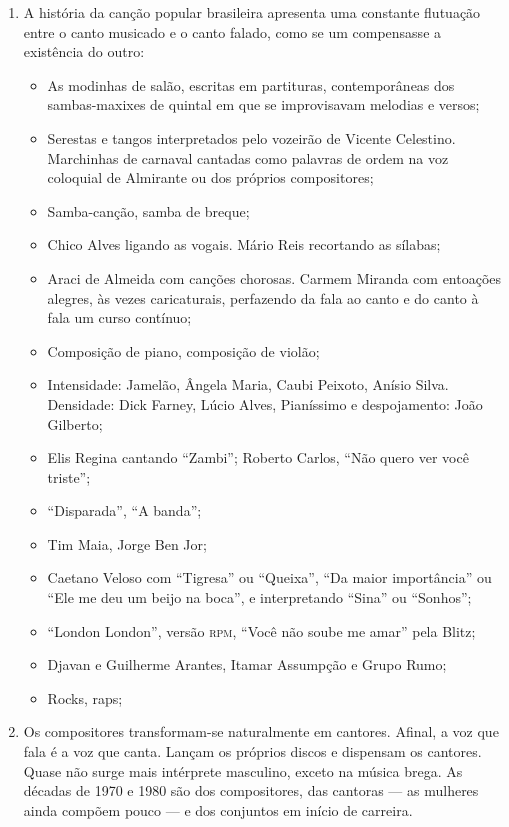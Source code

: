 \begin{enumerate}
\item A história da canção popular brasileira apresenta uma constante
flutuação entre o canto musicado e o canto falado, como se um
compensasse a existência do outro:

\begin{itemize}
\item As modinhas de salão, escritas em partituras, contemporâneas
dos sambas-maxixes de quintal em que se improvisavam melodias e versos;

\item Serestas e tangos interpretados pelo vozeirão de Vicente Celestino.
Marchinhas de carnaval cantadas como palavras de ordem na voz coloquial
de Almirante ou dos próprios compositores;

\item Samba-canção, samba de breque;

\item Chico Alves ligando as vogais. Mário Reis recortando as sílabas;

\item Araci de Almeida com canções chorosas. Carmem Miranda com entoações
alegres, às vezes caricaturais, perfazendo da fala ao canto e do canto à
fala um curso contínuo;

\item Composição de piano, composição de violão;

\item Intensidade: Jamelão, Ângela Maria, Caubi Peixoto, Anísio Silva.
Densidade: Dick Farney, Lúcio Alves, Pianíssimo e despojamento: João
Gilberto;

\item Elis Regina cantando ``Zambi''; Roberto Carlos, ``Não quero ver você triste'';

\item ``Disparada'', ``A banda'';

\item Tim Maia, Jorge Ben Jor;

\item Caetano Veloso com ``Tigresa'' ou ``Queixa'', ``Da maior importância''
ou ``Ele me deu um beijo na boca'', e interpretando ``Sina'' ou ``Sonhos'';

\item ``London London'', versão \textsc{rpm}, ``Você não soube me amar'' pela Blitz;

\item Djavan e Guilherme Arantes, Itamar Assumpção e Grupo Rumo;

\item Rocks, raps;
\end{itemize}

\item Os compositores transformam-se naturalmente em cantores. Afinal, a
voz que fala é a voz que canta. Lançam os próprios discos e dispensam os
cantores. Quase não surge mais intérprete masculino, exceto na música
brega. As décadas de 1970 e 1980 são dos compositores, das cantoras --- as
mulheres ainda compõem pouco --- e dos conjuntos em início de carreira.
\end{enumerate}


